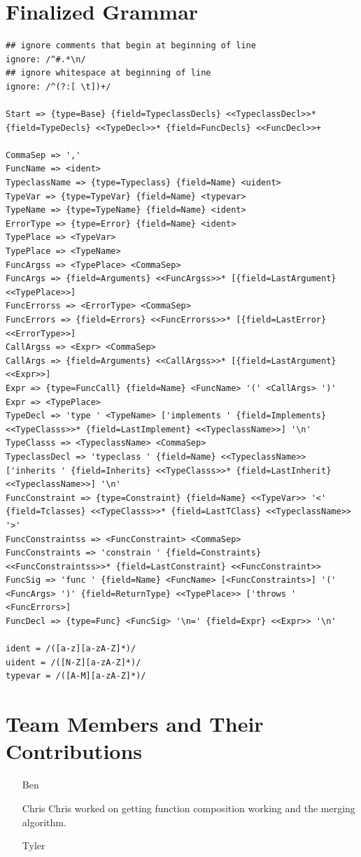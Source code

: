 \documentclass{acm_proc_article-sp}
\begin{document}
\section{Finalized Grammar}
	\begin{lstlisting}
## ignore comments that begin at beginning of line
ignore: /^#.*\n/
## ignore whitespace at beginning of line
ignore: /^(?:[ \t])+/

Start => {type=Base} {field=TypeclassDecls} <<TypeclassDecl>>* {field=TypeDecls} <<TypeDecl>>* {field=FuncDecls} <<FuncDecl>>+

CommaSep => ','
FuncName => <ident>
TypeclassName => {type=Typeclass} {field=Name} <uident>
TypeVar => {type=TypeVar} {field=Name} <typevar>
TypeName => {type=TypeName} {field=Name} <ident>
ErrorType => {type=Error} {field=Name} <ident>
TypePlace => <TypeVar>
TypePlace => <TypeName>
FuncArgss => <TypePlace> <CommaSep>
FuncArgs => {field=Arguments} <<FuncArgss>>* [{field=LastArgument} <<TypePlace>>]
FuncErrorss => <ErrorType> <CommaSep>
FuncErrors => {field=Errors} <<FuncErrorss>>* [{field=LastError} <<ErrorType>>]
CallArgss => <Expr> <CommaSep>
CallArgs => {field=Arguments} <<CallArgss>>* [{field=LastArgument} <<Expr>>]
Expr => {type=FuncCall} {field=Name} <FuncName> '(' <CallArgs> ')'
Expr => <TypePlace>
TypeDecl => 'type ' <TypeName> ['implements ' {field=Implements} <<TypeClasss>>* {field=LastImplement} <<TypeclassName>>] '\n'
TypeClasss => <TypeclassName> <CommaSep>
TypeclassDecl => 'typeclass ' {field=Name} <<TypeclassName>> ['inherits ' {field=Inherits} <<TypeClasss>>* {field=LastInherit} <<TypeclassName>>] '\n'
FuncConstraint => {type=Constraint} {field=Name} <<TypeVar>> '<' {field=Tclasses} <<TypeClasss>>* {field=LastTClass} <<TypeclassName>> '>'
FuncConstraintss => <FuncConstraint> <CommaSep>
FuncConstraints => 'constrain ' {field=Constraints} <<FuncConstraintss>>* {field=LastConstraint} <<FuncConstraint>>
FuncSig => 'func ' {field=Name} <FuncName> [<FuncConstraints>] '(' <FuncArgs> ')' {field=ReturnType} <<TypePlace>> ['throws ' <FuncErrors>]
FuncDecl => {type=Func} <FuncSig> '\n=' {field=Expr} <<Expr>> '\n'

ident = /([a-z][a-zA-Z]*)/
uident = /([N-Z][a-zA-Z]*)/
typevar = /([A-M][a-zA-Z]*)/
	\end{lstlisting}

\section{Team Members and Their Contributions}
	\begin{itemize}
		\item[Ben]
		\item[Chris] Chris worked on getting function composition working and
			the merging algorithm. 
		\item[Tyler]
	\end{itemize}
\end{document}
